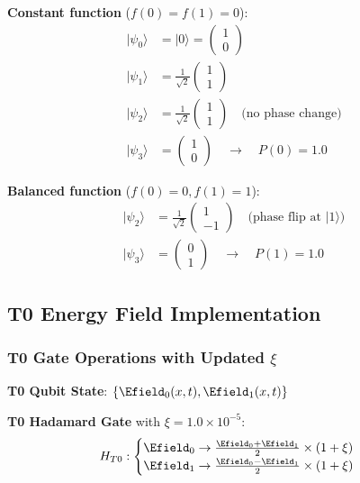 	\textbf{Constant function} ($f(0) = f(1) = 0$):
	\begin{align}
		|\psi_0\rangle &= |0\rangle = \begin{pmatrix} 1 \\ 0 \end{pmatrix} \\
		|\psi_1\rangle &= \frac{1}{\sqrt{2}}\begin{pmatrix} 1 \\ 1 \end{pmatrix} \\
		|\psi_2\rangle &= \frac{1}{\sqrt{2}}\begin{pmatrix} 1 \\ 1 \end{pmatrix} \quad \text{(no phase change)} \\
		|\psi_3\rangle &= \begin{pmatrix} 1 \\ 0 \end{pmatrix} \quad \rightarrow \quad P(0) = 1.0
	\end{align}
	
	\textbf{Balanced function} ($f(0) = 0, f(1) = 1$):
	\begin{align}
		|\psi_2\rangle &= \frac{1}{\sqrt{2}}\begin{pmatrix} 1 \\ -1 \end{pmatrix} \quad \text{(phase flip at } |1\rangle\text{)} \\
		|\psi_3\rangle &= \begin{pmatrix} 0 \\ 1 \end{pmatrix} \quad \rightarrow \quad P(1) = 1.0
	\end{align}
	
	\subsection{T0 Energy Field Implementation}
	
	\subsubsection{T0 Gate Operations with Updated $\xi$}
	
	\textbf{T0 Qubit State}: $\{\Efield_0(x,t), \Efield_1(x,t)\}$
	
	\textbf{T0 Hadamard Gate} with $\xi = 1.0 \times 10^{-5}$:
	\begin{equation}
		H_{T0}: \begin{cases}
			\Efield_0 \rightarrow \frac{\Efield_0 + \Efield_1}{2} \times (1 + \xi) \\
			\Efield_1 \rightarrow \frac{\Efield_0 - \Efield_1}{2} \times (1 + \xi)
		\end{cases}
	\end{equation}
	
